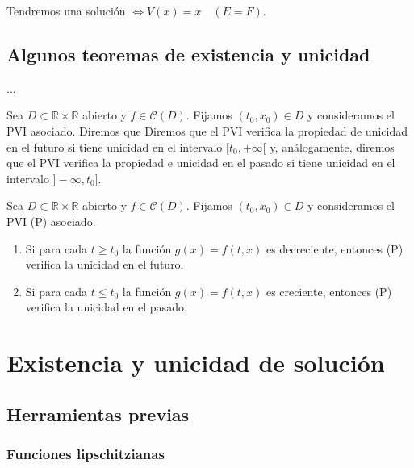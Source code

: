 \documentclass{article}
\begin{document}
  Tendremos una solución $\Leftrightarrow V(x) = x \quad (E=F)$.

  \subsection{Algunos teoremas de existencia y unicidad}

\begin{thm}
  ...
\end{thm}

\begin{definition}
  \label{def:unicidad-futuro}
  Sea $D \subset \mathbb{R} \times \mathbb{R}$ abierto y $f \in \mathcal{C}(D)$. Fijamos
  $(t_0, x_0) \in D$ y consideramos el PVI asociado. Diremos que Diremos que el PVI verifica la
  propiedad de unicidad en el futuro si tiene unicidad en el intervalo $[t_0, +\infty[$ y,
  análogamente, diremos que el PVI verifica la propiedad e unicidad en el pasado si tiene unicidad
  en el intervalo $]-\infty, t_0]$.
\end{definition}

\begin{thm}
  Sea $D \subset \mathbb{R} \times \mathbb{R}$ abierto y $f \in \mathcal{C}(D)$. Fijamos
  $(t_0, x_0) \in D$ y consideramos el PVI (P) asociado.
  \begin{enumerate}
  \item\label{item:peano:a} Si para cada $t \ge t_0$ la función $g(x) = f(t,x)$ es decreciente,
    entonces (P) verifica la unicidad en el futuro.
  \item\label{item:peano:b} Si para cada $t \le t_0$ la función $g(x) = f(t,x)$ es creciente,
    entonces (P) verifica la unicidad en el pasado.
  \end{enumerate}
\end{thm}

\section{Existencia y unicidad de solución} \label{sec:eu}

\subsection{Herramientas previas}

\subsubsection{Funciones lipschitzianas}
\end{document}
